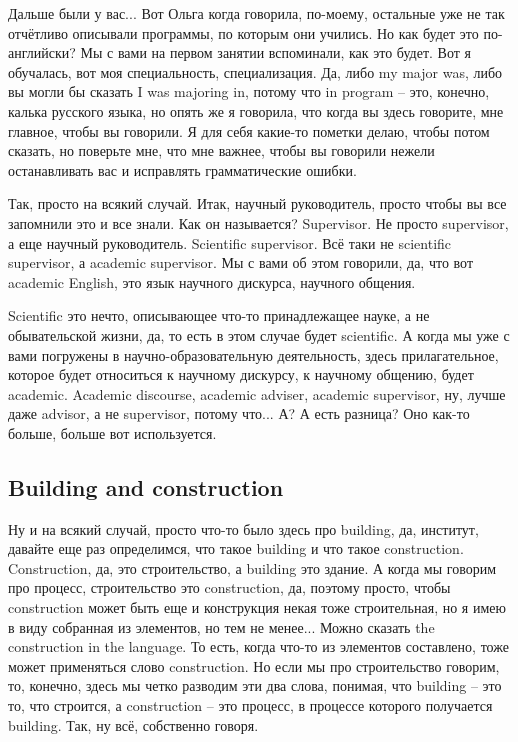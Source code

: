 \documentclass[main.tex]{subfiles}
\begin{document}
Дальше были у вас...
Вот Ольга когда говорила, по-моему, остальные уже не так отчётливо описывали программы, по которым они учились.
Но как будет это по-английски?
Мы с вами на первом занятии вспоминали, как это будет.
Вот я обучалась, вот моя специальность, специализация.
Да, либо my major was, либо вы могли бы сказать I was majoring in, потому что in program -- это, конечно, калька русского языка, но опять же я говорила, что когда вы здесь говорите, мне главное, чтобы вы говорили.
Я для себя какие-то пометки делаю, чтобы потом сказать, но поверьте мне, что мне важнее, чтобы вы говорили нежели останавливать вас и исправлять грамматические ошибки.

Так, просто на всякий случай.
Итак, научный руководитель, просто чтобы вы все запомнили это и все знали.
Как он называется? Supervisor.
Не просто supervisor, а еще научный руководитель.
Scientific supervisor.
Всё таки не scientific supervisor, а academic supervisor.
Мы с вами об этом говорили, да, что вот academic English, это язык научного дискурса, научного общения.

Scientific это нечто, описывающее что-то принадлежащее науке, а не обывательской жизни, да, то есть в этом случае будет scientific.
А когда мы уже с вами погружены в научно-образовательную деятельность, здесь прилагательное, которое будет относиться к научному дискурсу, к научному общению, будет academic.
Academic discourse, academic adviser, academic supervisor, ну, лучше даже advisor, а не supervisor, потому что...
А? А есть разница? Оно как-то больше, больше вот используется.

\subsection{Building and construction}

Ну и на всякий случай, просто что-то было здесь про building, да, институт, давайте еще раз определимся, что такое building и что такое construction.
Construction, да, это строительство, а building это здание.
А когда мы говорим про процесс, строительство это construction, да, поэтому просто, чтобы construction может быть еще и конструкция некая тоже строительная, но я имею в виду собранная из элементов, но тем не менее...
Можно сказать the construction in the language.
То есть, когда что-то из элементов составлено, тоже может применяться слово construction.
Но если мы про строительство говорим, то, конечно, здесь мы четко разводим эти два слова, понимая, что building -- это то, что строится, а construction -- это процесс, в процессе которого получается building.
Так, ну всё, собственно говоря.
\end{document}
